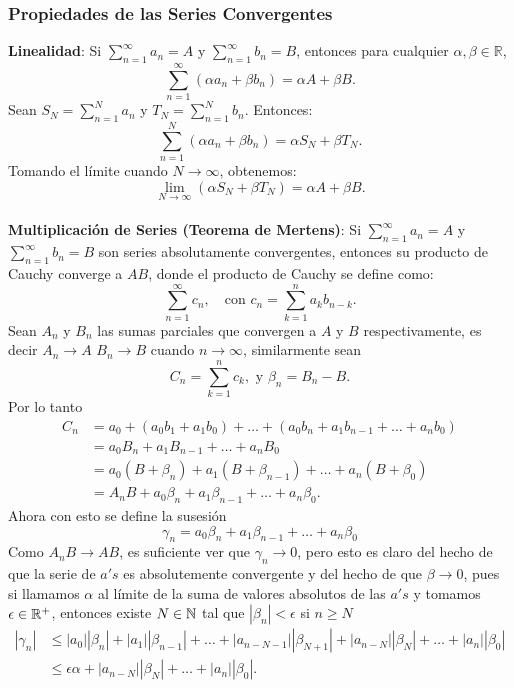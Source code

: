 \documentclass[main.tex]{subfiles}
\begin{document}
\subsubsection{Propiedades de las Series Convergentes}
\noindent\textbf{Linealidad}:
Si \(\sum_{n=1}^\infty a_n = A\) y \(\sum_{n=1}^\infty b_n = B\), entonces para cualquier \(\alpha, \beta \in \mathbb{R}\),
\[
\sum_{n=1}^\infty (\alpha a_n + \beta b_n) = \alpha A + \beta B.
\]
\dem Sean \(S_N = \sum_{n=1}^N a_n\) y \(T_N = \sum_{n=1}^N b_n\). Entonces:
\[
\sum_{n=1}^N (\alpha a_n + \beta b_n) = \alpha S_N + \beta T_N.
\]
Tomando el límite cuando \(N \to \infty\), obtenemos:
\[
\lim_{N \to \infty} \left( \alpha S_N + \beta T_N \right) = \alpha A + \beta B.
\]
\QED\\
\noindent\textbf{Multiplicación de Series (Teorema de Mertens)}:
Si \(\sum_{n=1}^\infty a_n = A\) y \(\sum_{n=1}^\infty b_n = B\) son series absolutamente convergentes, entonces su producto de Cauchy converge a \(AB\), donde el producto de Cauchy se define como:
\[
\sum_{n=1}^\infty c_n, \quad \text{con } c_n = \sum_{k=1}^n a_k b_{n-k}.
\]
\dem Sean \(A_n\) y \(B_n\) las sumas parciales que convergen a \(A\) y \(B\) respectivamente, es decir \(A_n\to A\) \(B_n\to B\) cuando \(n\to\infty\), similarmente sean
\[
C_n=\sum_{k=1}^n c_k,  \text{ y }\beta_n=B_n-B.
\]
\noindent Por lo tanto
\begin{align*}
C_n&=a_0+(a_0b_1+a_1b_0)+\dots+(a_0b_n+a_1b_{n-1}+\dots+a_nb_0)\\
    &=a_0B_n+a_1B_{n-1}+\dots+a_nB_0\\
    &=a_0(B+\beta_n)+a_1(B+\beta_{n-1})+\dots+a_n(B+\beta_0)\\
    &=A_nB+a_0\beta_n+a_1\beta_{n-1}+\dots+a_n\beta_0.
\end{align*}
Ahora con esto se define la susesión
\[
\gamma_n=a_0\beta_n+a_1\beta_{n-1}+\dots+a_n\beta_0
\]
Como \(A_nB\to AB\), es suficiente ver que \(\gamma_n\to0\), pero esto es claro del hecho de que la serie de \(a's\) es absolutemente convergente y del hecho de que \(\beta\to0\), pues si llamamos \(\alpha\) al límite de la suma de valores absolutos de las \(a's\) y tomamos \(\epsilon\in\mathbb R ^{+}\), entonces  existe \(N\in \mathbb N \) tal que \(|\beta_n|<\epsilon\) si \(n\geq N\)
\begin{align*}
|\gamma_n|&\leq |a_0||\beta_n|+|a_1||\beta_{n-1}|+\dots +|a_{n-N-1}||\beta_{N+1}| +|a_{n-N}||\beta_{N}|+\dots+|a_n||\beta_0|\\
        &\leq \epsilon\alpha +|a_{n-N}||\beta_{N}|+\dots+|a_n||\beta_0|.
\end{align*}
\end{document}

